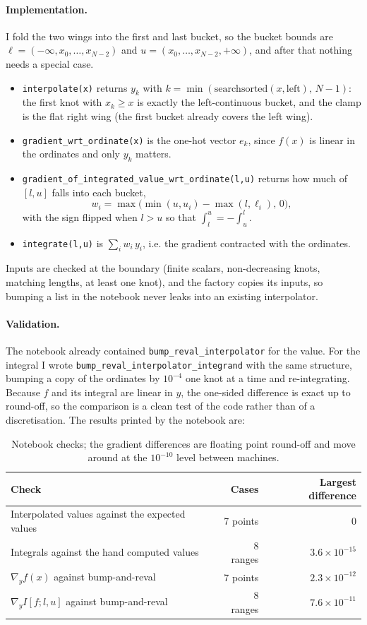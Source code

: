 \documentclass[11pt]{article}
\newcommand{\code}[1]{\texttt{#1}}
\begin{document}
\paragraph{Implementation.} I fold the two wings into the first and last bucket, so the bucket bounds are
$\ell = (-\infty, x_0, \dots, x_{N-2})$ and $u = (x_0, \dots, x_{N-2}, +\infty)$, and after that nothing needs a special case.
\begin{itemize}
\item \code{interpolate(x)} returns $y_k$ with $k = \min(\text{searchsorted}(x, \text{left}),\, N-1)$: the first knot with
$x_k \ge x$ is exactly the left-continuous bucket, and the clamp is the flat right wing (the first bucket already covers the left wing).
\item \code{gradient\_wrt\_ordinate(x)} is the one-hot vector $e_k$, since $f(x)$ is linear in the ordinates and only $y_k$ matters.
\item \code{gradient\_of\_integrated\_value\_wrt\_ordinate(l,u)} returns how much of $[l,u]$ falls into each bucket,
\[ w_i = \max\bigl(\min(u,u_i) - \max(l,\ell_i),\,0\bigr), \]
with the sign flipped when $l > u$ so that $\int_l^u = -\int_u^l$.
\item \code{integrate(l,u)} is $\sum_i w_i\,y_i$, i.e. the gradient contracted with the ordinates.
\end{itemize}
Inputs are checked at the boundary (finite scalars, non-decreasing knots, matching lengths, at least one knot), and the factory
copies its inputs, so bumping a list in the notebook never leaks into an existing interpolator.

\paragraph{Validation.} The notebook already contained \code{bump\_reval\_interpolator} for the value. For the integral I wrote
\code{bump\_reval\_interpolator\_integrand} with the same structure, bumping a copy of the ordinates by $10^{-4}$ one knot at a time and re-integrating. Because $f$ and its
integral are linear in $y$, the one-sided difference is exact up to round-off, so the comparison is a clean test of the code rather
than of a discretisation. The results printed by the notebook are:

\begin{table}[H]\centering\small
\begin{tabular}{@{}lrr@{}}\toprule
Check & Cases & Largest difference \\ \midrule
Interpolated values against the expected values & 7 points & $0$ \\
Integrals against the hand computed values & 8 ranges & $3.6\times10^{-15}$ \\
$\nabla_y f(x)$ against bump-and-reval & 7 points & $2.3\times10^{-12}$ \\
$\nabla_y I[f;l,u]$ against bump-and-reval & 8 ranges & $7.6\times10^{-11}$ \\ \bottomrule
\end{tabular}
\caption{Notebook checks; the gradient differences are floating point round-off and move around at the $10^{-10}$ level between machines.}
\end{table}
\end{document}
